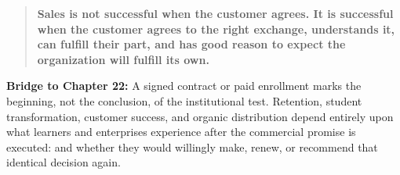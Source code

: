 \begin{quote}
\textbf{Sales is not successful when the customer agrees. It is successful when the customer agrees to the right exchange, understands it, can fulfill their part, and has good reason to expect the organization will fulfill its own.}
\end{quote}

\textbf{Bridge to Chapter 22:} A signed contract or paid enrollment marks the beginning, not the conclusion, of the institutional test. Retention, student transformation, customer success, and organic distribution depend entirely upon what learners and enterprises experience after the commercial promise is executed: and whether they would willingly make, renew, or recommend that identical decision again.

